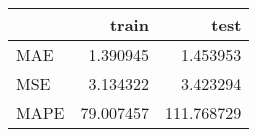 \begin{tabular}{lrr}
\toprule
{} &      train &        test \\
\midrule
MAE  &   1.390945 &    1.453953 \\
MSE  &   3.134322 &    3.423294 \\
MAPE &  79.007457 &  111.768729 \\
\bottomrule
\end{tabular}
